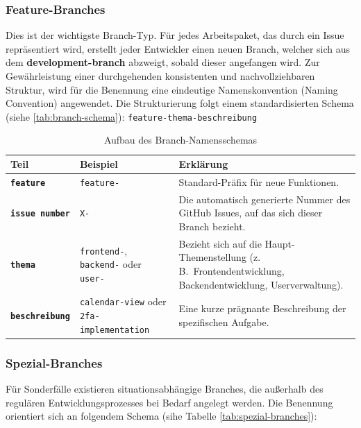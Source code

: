 \subsubsection{Feature-Branches}
Dies ist der wichtigste Branch-Typ. Für jedes Arbeitspaket, das durch ein Issue repräsentiert wird, erstellt jeder Entwickler einen neuen Branch, welcher sich aus dem \textbf{development-branch} abzweigt, sobald dieser angefangen wird. Zur Gewährleistung einer durchgehenden konsistenten und nachvollziehbaren Struktur, wird für die Benennung eine eindeutige Namenskonvention (Naming Convention) angewendet. 
Die Strukturierung folgt einem standardisierten Schema (siehe \autoref{tab:branch-schema}):
\texttt{feature-\textlangle thema\textrangle-\textlangle beschreibung\textrangle}

\begin{table}[h]
\centering
\begin{tabular}{|p{}|p{}|p{}|}
\hline
\textbf{Teil} & \textbf{Beispiel} & \textbf{Erklärung} \\
\hline
\texttt{\textbf{feature}} &
\texttt{feature-} &
Standard-Präfix für neue Funktionen. \\
\hline
\texttt{\textbf{issue number}} &
\texttt{X-} &
Die automatisch generierte Nummer des GitHub Issues, auf das sich dieser Branch bezieht. \\
\hline
\texttt{\textbf{thema}} &
\texttt{frontend-}, \texttt{backend-} oder \texttt{user-} &
Bezieht sich auf die Haupt-Themenstellung (z.\,B.\ Frontendentwicklung, Backendentwicklung, Userverwaltung).\\
\hline
\texttt{\textbf{beschreibung}} &
\texttt{calendar-view} oder \texttt{2fa-implementation} &
Eine kurze prägnante Beschreibung der spezifischen Aufgabe.\\
\hline
\end{tabular}
\caption{Aufbau des Branch-Namensschemas}
\label{tab:branch-schema}
\end{table}
\subsubsection{Spezial-Branches}
Für Sonderfälle existieren situationsabhängige Branches, die außerhalb des 
regulären Entwicklungsprozesses bei Bedarf angelegt werden.\newline
Die Benennung orientiert sich an folgendem Schema (sihe Tabelle \autoref{tab:spezial-branches}):

